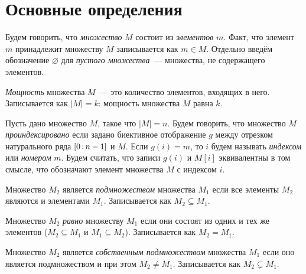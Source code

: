 \section{Основные определения}
\label{sec:SetTheoryBasicDefinitions}

Будем говорить, что \emph{множество} $M$ состоит из \emph{элементов} $m$.
Факт, что элемент $m$ принадлежит множеству $M$ записывается как $m \in M$.
Отдельно введём обозначение $\varnothing$ для \emph{пустого множества}~--- множества, не содержащего элементов.

\begin{definition}
    \emph{Мощность} множества $M$~--- это количество элементов, входящих в него.
    Записывается как $|M| = k$: мощность множества $M$ равна $k$.
\end{definition}

\begin{definition}
    \label{def:SetIndexing}
    Пусть дано множество $M$, такое что $|M| = n$.
    Будем говорить, что множество $M$ \emph{проиндексировано} если задано биективное отображение $g$ между отрезком натурального ряда $[0 \rng n-1]$ и $M$.
    Если $g(i) = m$, то $i$ будем называть \emph{индексом} или \emph{номером} $m$.
    Будем считать, что записи $g(i)$ и $M[i]$ эквивалентны в том смысле, что обозначают элемент множества $M$ с индексом $i$.
\end{definition}

\begin{definition}[Подмножество]
    Множество $M_2$ является \emph{подмножеством} множества $M_1$ если все элементы $M_2$ являются и элементами $M_1$.
    Записывается как $M_2 \subseteq M_1$.
\end{definition}

\begin{definition}
    Множество $M_2$ \emph{равно} множеству $M_1$ если они состоят из одних и тех же элементов ($M_2 \subseteq M_1$ и $M_1 \subseteq M_2$).
    Записывается как $M_2 = M_1$.
\end{definition}

\begin{definition}
    Множество $M_2$ является \emph{собственным подмножеством} множества $M_1$ если оно является подмножеством и при этом $M_2 \neq M_1$.
    Записывается как $M_2 \varsubsetneq M_1$.
\end{definition}

